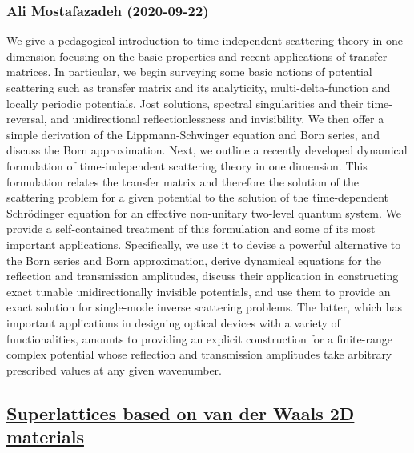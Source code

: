 {\subsubsection*{Ali Mostafazadeh (2020-09-22)}
We give a pedagogical introduction to time-independent scattering theory in
one dimension focusing on the basic properties and recent applications of
transfer matrices. In particular, we begin surveying some basic notions of
potential scattering such as transfer matrix and its analyticity,
multi-delta-function and locally periodic potentials, Jost solutions, spectral
singularities and their time-reversal, and unidirectional reflectionlessness
and invisibility. We then offer a simple derivation of the Lippmann-Schwinger
equation and Born series, and discuss the Born approximation. Next, we outline
a recently developed dynamical formulation of time-independent scattering
theory in one dimension. This formulation relates the transfer matrix and
therefore the solution of the scattering problem for a given potential to the
solution of the time-dependent Schr\"odinger equation for an effective
non-unitary two-level quantum system. We provide a self-contained treatment of
this formulation and some of its most important applications. Specifically, we
use it to devise a powerful alternative to the Born series and Born
approximation, derive dynamical equations for the reflection and transmission
amplitudes, discuss their application in constructing exact tunable
unidirectionally invisible potentials, and use them to provide an exact
solution for single-mode inverse scattering problems. The latter, which has
important applications in designing optical devices with a variety of
functionalities, amounts to providing an explicit construction for a
finite-range complex potential whose reflection and transmission amplitudes
take arbitrary prescribed values at any given wavenumber.

\subsection*{\href{http://arxiv.org/abs/2009.10506v1}{Superlattices based on van der Waals 2D materials}}
}
